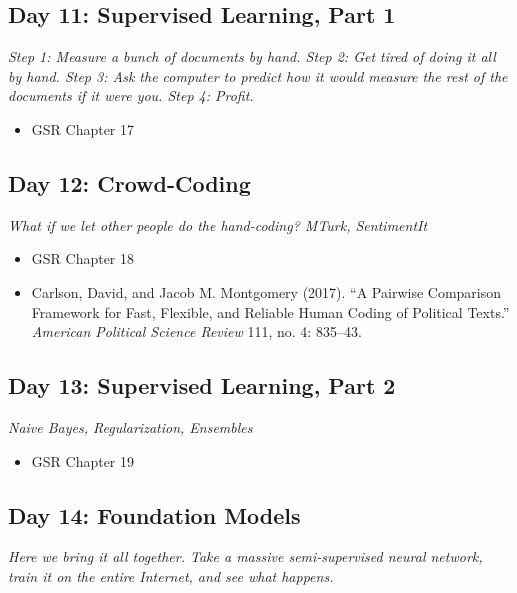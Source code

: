 \documentclass[11pt, letterpaper]{article}
\begin{document}
\subsection*{Day 11: Supervised Learning, Part 1}

\textit{Step 1: Measure a bunch of documents by hand. Step 2: Get tired of doing it all by hand. Step 3: Ask the computer to predict how it would measure the rest of the documents if it were you. Step 4: Profit.}

\begin{itemize}
	\item GSR Chapter 17
\end{itemize}



\subsection*{Day 12: Crowd-Coding}

\textit{What if we let other people do the hand-coding? MTurk, SentimentIt}

\begin{itemize}
	\item GSR Chapter 18
	\item Carlson, David, and Jacob M. Montgomery (2017). ``A Pairwise Comparison Framework for Fast, Flexible, and Reliable Human Coding of Political Texts.'' \textit{American Political Science Review} 111, no. 4: 835–43.
	
\end{itemize}

\subsection*{Day 13: Supervised Learning, Part 2}

\textit{Naive Bayes, Regularization, Ensembles}

\begin{itemize}
	\item GSR Chapter 19
\end{itemize}

\subsection*{Day 14: Foundation Models}

\textit{Here we bring it all together. Take a massive semi-supervised neural network, train it on the entire Internet, and see what happens.}
\end{document}
